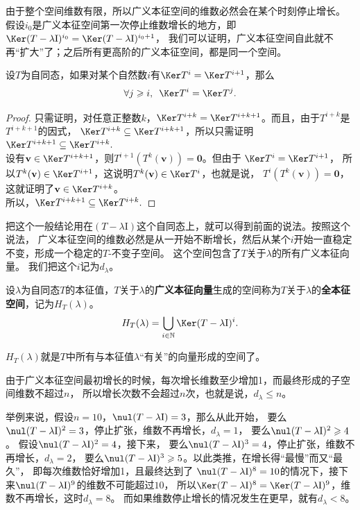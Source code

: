 \documentclass[12pt,UTF8]{ctexbook}
\begin{document}
由于整个空间维数有限，所以广义本征空间的维数必然会在某个时刻停止增长。
假设$i_0$是广义本征空间第一次停止维数增长的地方，即$\Ker (T - \lambda\mathrm{I})^{i_0} = \Ker (T - \lambda\mathrm{I})^{i_0+1}$，
我们可以证明，广义本征空间自此就不再“扩大”了；之后所有更高阶的广义本征空间，都是同一个空间。
\begin{pp}\label{pp:6_12_2}
    设$T$为自同态，如果对某个自然数$i$有$\Ker T^{i} = \Ker T^{i+1}$，那么
    $$ \forall j \geqslant i, \,\,\, \Ker T^{i} = \Ker T^{j}.$$
\end{pp}
\begin{proof} %
    只需证明，对任意正整数$k$，$\Ker T^{i+k} = \Ker T^{i+k+1}$。而且，由于$T^{i+k}$是$T^{i+k+1}$的因式，
    $\Ker T^{i+k} \subseteq \Ker T^{i+k+1}$，所以只需证明$\Ker T^{i+k+1} \subseteq \Ker T^{i+k}.$\\
    设有$\mathbf{v}\in\Ker T^{i+k+1}$，则$T^{i+1}(T^k(\mathbf{v})) = \mathbf{0}$。但由于 $\Ker T^{i} = \Ker T^{i+1}$，
    所以$T^k(\mathbf{v}) \in \Ker T^{i+1} $，这说明$T^k(\mathbf{v}) \in \Ker T^{i}$，也就是说，
    $T^{i}(T^k(\mathbf{v})) = \mathbf{0}$，这就证明了$\mathbf{v}\in\Ker T^{i+k}$。\\
    所以，$\Ker T^{i+k+1} \subseteq \Ker T^{i+k}.$

\end{proof}

把这个一般结论用在$(T - \lambda\mathrm{I})$这个自同态上，就可以得到前面的说法。按照这个说法，
广义本征空间的维数必然是从一开始不断增长，然后从某个$i$开始一直稳定不变，形成一个稳定的$T$-不变子空间。
这个空间包含了$T$关于$\lambda$的所有广义本征向量。
我们把这个$i$记为$d_\lambda$。
\begin{df}\label{df:6_4_2}
    设$\lambda$为自同态$T$的本征值，$T$关于$\lambda$的\textbf{广义本征向量}生成的空间称为$T$关于$\lambda$的\textbf{全本征空间}，记为$H_T(\lambda)$。
    $$ H_T(\lambda) = \bigcup_{i\in\mathbb{N}} \Ker (T - \lambda\mathrm{I})^i.$$
\end{df}
$H_T(\lambda)$就是$T$中所有与本征值$\lambda$“有关”的向量形成的空间了。

由于广义本征空间最初增长的时候，每次增长维数至少增加1，而最终形成的子空间维数不超过$n$，
所以增长次数不会超过$n$次，也就是说，$d_\lambda\leqslant n$。

举例来说，假设$n=10$，$\nul (T - \lambda\mathrm{I}) = 3$，那么从此开始，
要么$\nul (T - \lambda\mathrm{I})^2 = 3$，停止扩张，维数不再增长，$d_\lambda=1$，
要么$\nul (T - \lambda\mathrm{I})^2 \geqslant 4$。
假设$\nul (T - \lambda\mathrm{I})^2 = 4$，接下来，
要么$\nul (T - \lambda\mathrm{I})^3 = 4$，停止扩张，维数不再增长，$d_\lambda=2$，
要么$\nul (T - \lambda\mathrm{I})^3 \geqslant 5$。以此类推，在增长得“最慢”而又“最久”，
即每次维数恰好增加1，且最终达到了
$\nul (T - \lambda\mathrm{I})^8 = 10$的情况下，接下来$\nul (T - \lambda\mathrm{I})^9$的维数不可能超过$10$，
所以$\Ker (T - \lambda\mathrm{I})^8 = \Ker (T - \lambda\mathrm{I})^9$，维数不再增长，这时$d_\lambda=8$。
而如果维数停止增长的情况发生在更早，就有$d_\lambda<8$。
\end{document}
